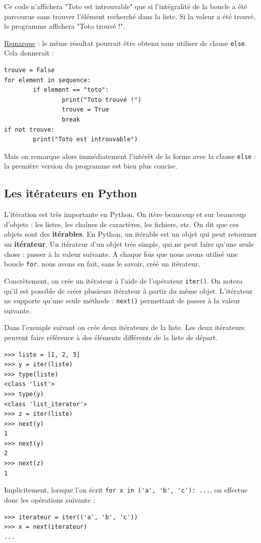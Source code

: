 \documentclass[12pt, a4paper]{article}
\begin{document}
Ce code n'affichera "Toto est introuvable" que si l'intégralité de la boucle a été parcourue sans trouver l'élément recherché dans la liste. Si la valeur a été trouvé, le programme affichera "Toto trouvé !". 

\underline{Remarque} : le même résultat pourrait être obtenu sans utiliser de clause \lstinline{else}. Cela donnerait :
\begin{lstlisting}
trouve = False
for element in sequence:
		if element == "toto":
				print("Toto trouvé !")
				trouve = True
				break
if not trouve:
		print("Toto est introuvable")
\end{lstlisting}

Mais on remarque alors immédiatement l'intérêt de la forme avec la clause \lstinline{else} : la première version du programme est bien plus concise.


\subsection{Les itérateurs en Python}
\label{sec:iteration}
L'itération est très importante en Python. On itère beaucoup et sur beaucoup d'objets : les listes, les chaînes de caractères, les fichiers, etc. On dit que ces objets sont des \textbf{itérables}. En Python, un itérable est un objet qui peut retourner un \textbf{itérateur}. Un itérateur d'un objet très simple, qui ne peut faire qu'une seule chose : passer à la valeur suivante. A chaque fois que nous avons utilisé une boucle \lstinline{for}, nous avons en fait, sans le savoir, créé un itérateur. 

Concrètement, on crée un itérateur à l'aide de l'opérateur \lstinline{iter()}. On notera qu'il est possible de créer plusieurs itérateur à partir du même objet. L'itérateur ne supporte qu'une seule méthode : \lstinline{next()} permettant de passer à la valeur suivante.

Dans l'exemple suivant on crée deux itérateurs de la liste. Les deux itérateurs peuvent faire référence à des éléments différents de la liste de départ.
\begin{lstlisting}
>>> liste = [1, 2, 3]
>>> y = iter(liste)
>>> type(liste)
<class 'list'>
>>> type(y)
<class 'list_iterator'>
>>> z = iter(liste)
>>> next(y)
1
>>> next(y)
2
>>> next(z)
1
\end{lstlisting}

Implicitement, lorsque l'on écrit \lstinline{for x in ('a', 'b', 'c'): ...}, on effectue donc les opérations suivante :
\begin{lstlisting}
>>> iterateur = iter(('a', 'b', 'c'))
>>> x = next(iterateur)
...
\end{lstlisting}
\end{document}
